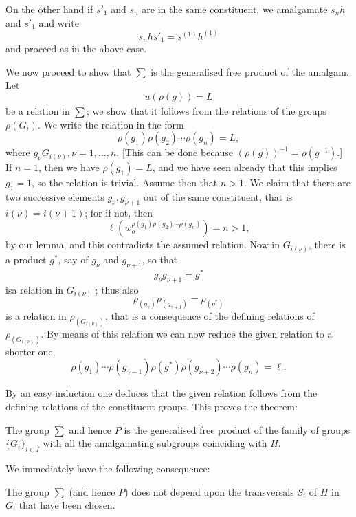 On the other hand if $s'_1$ and $s_n$ are in the same constituent, we\pageoriginale
amalgamate $s_n h$ and $s'_1$ and write 
$$
s_n hs'_1 = s^{(1)} h ^{(1)}
$$
and proceed as in the above case.	

We now proceed to show that $\sum$ is the generalised free product of
the amalgam. Let 
$$
u \underline{(\rho (g))} = L
$$
be a relation in $ \sum $; we show that it follows from the relations
of the groups $\rho (G_i)$. We write the relation in the form  
$$
\rho (g_1) \rho (g_2) \cdots \rho (g_n) = L,
$$
where $g_{\nu} G_{i (\nu)}, \nu = 1,  \ldots, n$. [This can be done
  because $(\rho (g))^{-1} = \rho (g^{-1})$.] If $n=1$, then we have
$\rho (g_1) = L$, and we have seen already that this implies $g_1 =
1$, so the relation is trivial. Assume then that $n > 1$. We claim
that there are two successive elements $g_{\nu}, g_{\nu +1}$ out of
the same constituent, that is $i (\nu) = i (\nu +1)$; for if
not, then 
$$
\ell (w_o^{\rho (g_1) \rho (g_2) \cdots \rho (g_n)}) = n > 1,
$$
by our lemma, and this contradicts the assumed relation. Now in $G_{i
  (\nu)}$, there is a product $g^*$, say of $g_{\nu}$ and $g_{\nu
  +1}$, so that 
$$
g_\nu g _{ \nu + 1} = g^*
$$
is\pageoriginale a relation in $G_{i (\nu)}$ ; thus also 
$$
\rho_{(g_\gamma)} \rho _{(g_{ \gamma + 1})} = \rho_ {(g^*)}
$$
is a relation in $\rho_{ (G_{i(\nu)})}$, that is a consequence of the
defining relations of $\rho_{ (G_{i(\nu)})}$. By means of this
relation we can now reduce the given relation to a shorter one,  
$$
 \rho (g_1) \cdots \rho ( g _{ \gamma - 1}) \rho (g^*) \rho (g_{\nu +
   2})\cdots \rho (g_n) = \ell. 
$$

By an easy induction one deduces that the given relation follows from
the defining relations of the constituent groups. This proves the
theorem:  
\begin{theorem}\label{chap9:sec5:thm5} %
  The group $\sum$ and hence $P$ is the generalised free product of
  the family of groups $\big\{G_i \big\}_{ i \in I}$ with all
  the amalgamating subgroups coinciding with $H$.  
\end{theorem}

We immediately have the following consequence: 

\begin{coro*}%
  The group $\sum$ (and hence $P$) does not depend upon the
  trans\-versals $S_i$ of $H$ in $G_i$ that have been chosen.  
\end{coro*}
